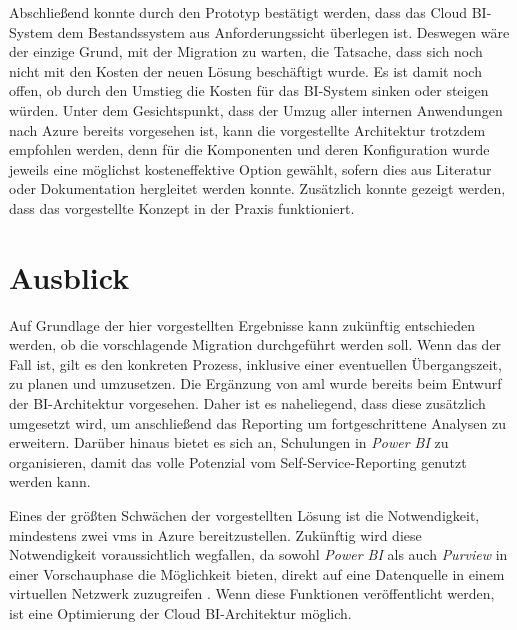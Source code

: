 Abschließend konnte durch den Prototyp bestätigt werden, dass das Cloud BI-System dem Bestandssystem aus Anforderungssicht überlegen ist. Deswegen wäre der einzige Grund, mit der Migration zu warten, die Tatsache, dass sich noch nicht mit den Kosten der neuen Lösung beschäftigt wurde. Es ist damit noch offen, ob durch den Umstieg die Kosten für das BI-System sinken oder steigen würden. Unter dem Gesichtspunkt, dass der Umzug aller internen Anwendungen nach Azure bereits vorgesehen ist, kann die vorgestellte Architektur trotzdem empfohlen werden, denn für die Komponenten und deren Konfiguration wurde jeweils eine möglichst kosteneffektive Option gewählt, sofern dies aus Literatur oder Dokumentation hergleitet werden konnte. Zusätzlich konnte gezeigt werden, dass das vorgestellte Konzept in der Praxis funktioniert.

\section{Ausblick}
Auf Grundlage der hier vorgestellten Ergebnisse kann zukünftig entschieden werden, ob die vorschlagende Migration durchgeführt werden soll. Wenn das der Fall ist, gilt es den konkreten Prozess, inklusive einer eventuellen Übergangszeit, zu planen und umzusetzen. Die Ergänzung von \ac{aml} wurde bereits beim Entwurf der BI-Architektur vorgesehen. Daher ist es naheliegend, dass diese zusätzlich umgesetzt wird, um anschließend das Reporting um fortgeschrittene Analysen zu erweitern. Darüber hinaus bietet es sich an, Schulungen in \textit{Power BI} zu organisieren, damit das volle Potenzial vom Self-Service-Reporting genutzt werden kann.

Eines der größten Schwächen der vorgestellten Lösung ist die Notwendigkeit, mindestens zwei \acp{vm} in Azure bereitzustellen. Zukünftig wird diese Notwendigkeit voraussichtlich wegfallen, da sowohl \textit{Power BI} als auch \textit{Purview} in einer Vorschauphase die Möglichkeit bieten, direkt auf eine Datenquelle in einem virtuellen Netzwerk zuzugreifen \cite{msdoc_22_purview_manPE, msdoc_22_pbi_vnetGateway}. Wenn diese Funktionen veröffentlicht werden, ist eine Optimierung der Cloud BI-Architektur möglich.